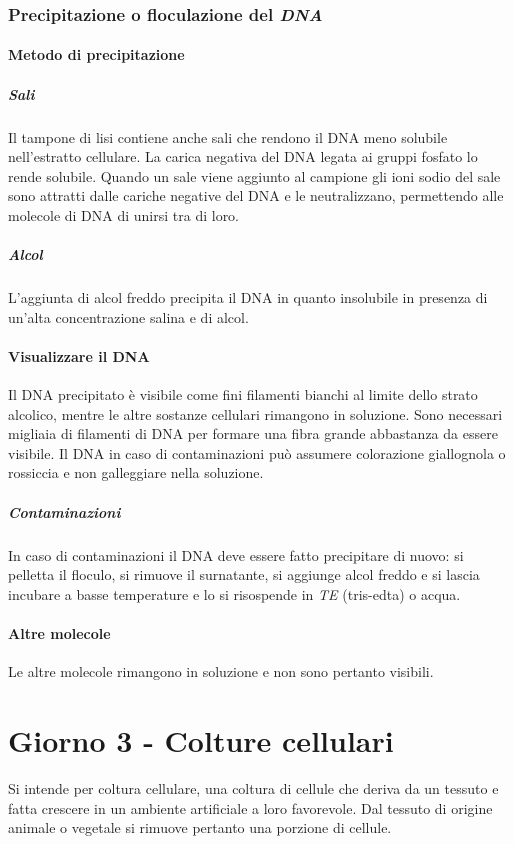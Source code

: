 		\subsubsection{Precipitazione o floculazione del \emph{DNA}}
			\paragraph{Metodo di precipitazione}
				\subparagraph{Sali}
				Il tampone di lisi contiene anche sali che rendono il DNA meno solubile nell'estratto cellulare.
				La carica negativa del DNA legata ai gruppi fosfato lo rende solubile.
				Quando un sale viene aggiunto al campione gli ioni sodio del sale sono attratti dalle cariche negative del DNA e le neutralizzano, permettendo alle molecole di DNA di unirsi tra di loro.
				
				\subparagraph{Alcol}
				L'aggiunta di alcol freddo precipita il DNA in quanto insolubile in presenza di un'alta concentrazione salina e di alcol.

			\paragraph{Visualizzare il DNA}
			Il DNA precipitato \`e visibile come fini filamenti bianchi al limite dello strato alcolico, mentre le altre sostanze cellulari rimangono in soluzione.
			Sono necessari migliaia di filamenti di DNA per formare una fibra grande abbastanza da essere visibile.
			Il DNA in caso di contaminazioni pu\`o assumere colorazione giallognola o rossiccia e non galleggiare nella soluzione. 
				
				\subparagraph{Contaminazioni}
				In caso di contaminazioni il DNA deve essere fatto precipitare di nuovo: si pelletta il floculo, si rimuove il surnatante, si aggiunge alcol freddo e si lascia incubare
				a basse temperature e lo si risospende in \emph{TE} (tris-edta) o acqua.
		
			\paragraph{Altre molecole}
			Le altre molecole rimangono in soluzione e non sono pertanto visibili.

\section{Giorno 3 - Colture cellulari}
Si intende per coltura cellulare, una coltura di cellule che deriva da un tessuto e fatta crescere in un ambiente artificiale a loro favorevole.
Dal tessuto di origine animale o vegetale si rimuove pertanto una porzione di cellule.
	
